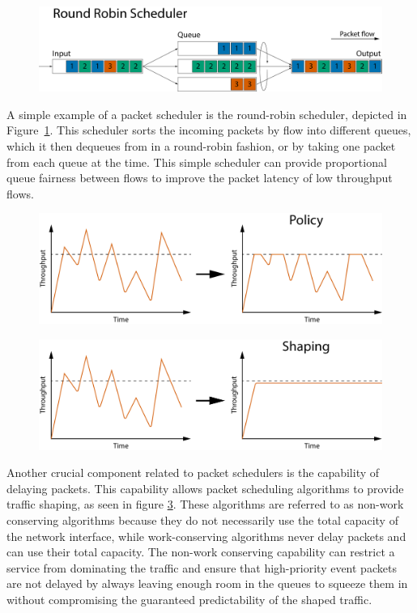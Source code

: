 \documentclass[sigconf, nonacm]{acmart}
\begin{document}
\begin{figure}
  \includegraphics[width=\linewidth]{round-robin.pdf}
  \caption{\label{fig:round_robin}}
\end{figure}

A simple example of a packet scheduler is the round-robin scheduler\cite{nagle1987packet}, depicted in Figure~\ref{fig:round_robin}. This scheduler sorts the incoming packets by flow into different queues, which it then dequeues from in a round-robin fashion, or by taking one packet from each queue at the time. This simple scheduler can provide proportional queue fairness between flows to improve the packet latency of low throughput flows.

\begin{figure}
  \includegraphics[width=\linewidth]{traffic-policy.pdf}
  \caption{\label{fig:traffic_policy}}
\end{figure}

\begin{figure}
  \includegraphics[width=\linewidth]{traffic-shaping.pdf}
  \caption{\label{fig:traffic_shaping}}
\end{figure}


Another crucial component related to packet schedulers is the capability of delaying packets. This capability allows packet scheduling algorithms to provide traffic shaping, as seen in figure \ref{fig:traffic_shaping}. These algorithms are referred to as non-work conserving algorithms because they do not necessarily use the total capacity of the network interface, while work-conserving algorithms never delay packets and can use their total capacity. The non-work conserving capability can restrict a service from dominating the traffic and ensure that high-priority event packets are not delayed by always leaving enough room in the queues to squeeze them in without compromising the guaranteed predictability of the shaped traffic.
\end{document}
